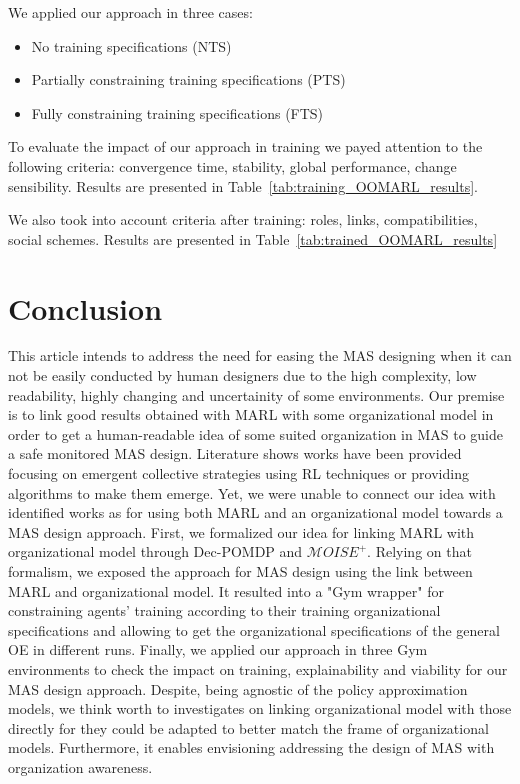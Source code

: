 \documentclass[runningheads]{llncs}
\begin{document}
We applied our approach in three cases:
\begin{itemize}
    \item No training specifications (NTS)
    \item Partially constraining training specifications (PTS)
    \item Fully constraining training specifications (FTS)
\end{itemize}

To evaluate the impact of our approach in training we payed attention to the following criteria: convergence time, stability, global performance, change sensibility. Results are presented in Table~\ref{tab:training_OOMARL_results}.



We also took into account criteria after training: roles, links, compatibilities, social schemes. Results are presented in Table~\ref{tab:trained_OOMARL_results}



\section{Conclusion}

This article intends to address the need for easing the MAS designing when it can not be easily conducted by human designers due to the high complexity, low readability, highly changing and uncertainity of some environments. Our premise is to link good results obtained with MARL with some organizational model in order to get a human-readable idea of some suited organization in MAS to guide a safe monitored MAS design. Literature shows works have been provided focusing on emergent collective strategies using RL techniques or providing algorithms to make them emerge. Yet, we were unable to connect our idea with identified works as for using both MARL and an organizational model towards a MAS design approach. First, we formalized our idea for linking MARL with organizational model through Dec-POMDP and $\mathcal{M}OISE^+$. Relying on that formalism, we exposed the approach for MAS design using the link between MARL and organizational model. It resulted into a "Gym wrapper" for constraining agents' training according to their training organizational specifications and allowing to get the organizational specifications of the general OE in different runs. Finally, we applied our approach in three Gym environments to check the impact on training, explainability and viability for our MAS design approach. Despite, being agnostic of the policy approximation models, we think worth to investigates on linking organizational model with those directly for they could be adapted to better match the frame of organizational models. Furthermore, it enables envisioning addressing the design of MAS with organization awareness.
\end{document}

